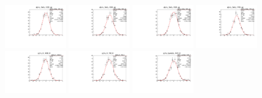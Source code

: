 \begin{figure}[h]\centering
    \includegraphics[width=0.24\textwidth]{figure/io_wo_bkg/alpha/pull_alpha_Delta_1232_pp.pdf}
    \includegraphics[width=0.24\textwidth]{figure/io_wo_bkg/alpha/pull_alpha_Delta_1600_pp.pdf}
    \includegraphics[width=0.24\textwidth]{figure/io_wo_bkg/alpha/pull_alpha_Delta_1620_pp.pdf}
    \includegraphics[width=0.24\textwidth]{figure/io_wo_bkg/alpha/pull_alpha_Delta_1700_pp.pdf}
    \includegraphics[width=0.24\textwidth]{figure/io_wo_bkg/alpha/pull_alpha_K_1430_0.pdf}
    \includegraphics[width=0.24\textwidth]{figure/io_wo_bkg/alpha/pull_alpha_K_700_0.pdf}
    \includegraphics[width=0.24\textwidth]{figure/io_wo_bkg/alpha/pull_alpha_Lambda_1405_0.pdf}

\end{figure}
